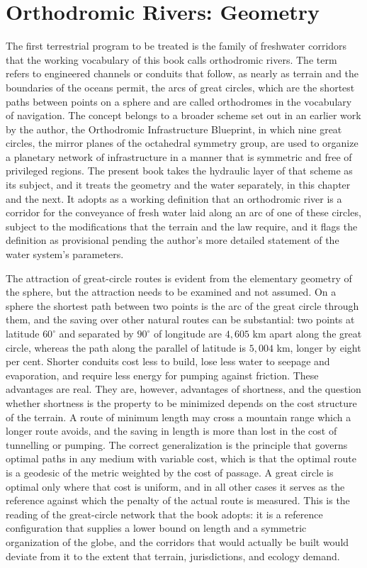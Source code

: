 \chapter{Orthodromic Rivers: Geometry}
\label{ch:17}

The first terrestrial program to be treated is the family of freshwater corridors that the working vocabulary of this book calls orthodromic rivers. The term refers to engineered channels or conduits that follow, as nearly as terrain and the boundaries of the oceans permit, the arcs of great circles, which are the shortest paths between points on a sphere and are called orthodromes in the vocabulary of navigation. The concept belongs to a broader scheme set out in an earlier work by the author, the Orthodromic Infrastructure Blueprint, in which nine great circles, the mirror planes of the octahedral symmetry group, are used to organize a planetary network of infrastructure in a manner that is symmetric and free of privileged regions. The present book takes the hydraulic layer of that scheme as its subject, and it treats the geometry and the water separately, in this chapter and the next. It adopts as a working definition that an orthodromic river is a corridor for the conveyance of fresh water laid along an arc of one of these circles, subject to the modifications that the terrain and the law require, and it flags the definition as provisional pending the author's more detailed statement of the water system's parameters.

The attraction of great-circle routes is evident from the elementary geometry of the sphere, but the attraction needs to be examined and not assumed. On a sphere the shortest path between two points is the arc of the great circle through them, and the saving over other natural routes can be substantial: two points at latitude $60^\circ$ and separated by $90^\circ$ of longitude are $4{,}605$ km apart along the great circle, whereas the path along the parallel of latitude is $5{,}004$ km, longer by eight per cent. Shorter conduits cost less to build, lose less water to seepage and evaporation, and require less energy for pumping against friction. These advantages are real. They are, however, advantages of shortness, and the question whether shortness is the property to be minimized depends on the cost structure of the terrain. A route of minimum length may cross a mountain range which a longer route avoids, and the saving in length is more than lost in the cost of tunnelling or pumping. The correct generalization is the principle that governs optimal paths in any medium with variable cost, which is that the optimal route is a geodesic of the metric weighted by the cost of passage. A great circle is optimal only where that cost is uniform, and in all other cases it serves as the reference against which the penalty of the actual route is measured. This is the reading of the great-circle network that the book adopts: it is a reference configuration that supplies a lower bound on length and a symmetric organization of the globe, and the corridors that would actually be built would deviate from it to the extent that terrain, jurisdictions, and ecology demand.

